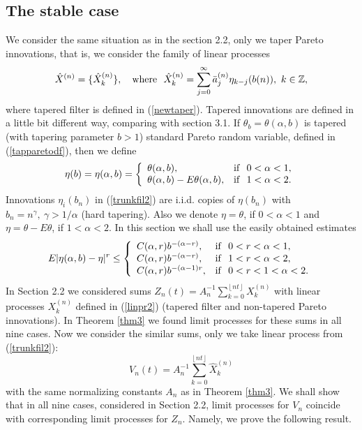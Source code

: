 \documentclass[12pt]{article}
\def\bz{{\bf Z}}
\def\bz{{\mathbb Z}} %
\def\a{\alpha}
\def\g{\gamma}
\newcommand{\sv}[1]{\left\lfloor #1 \right\rfloor}
\theoremstyle{plain}
\theoremstyle{definition}
\begin{document}
\subsection{The stable case}

We consider the same situation as in the section 2.2, only we taper Pareto innovations, that is, we consider the family of linear processes
\begin{equation}\label{trunkfil2}
{\hat X}^{(n)}=\{{\hat X}_k^{(n)} \}, \quad {\rm where} \ \  {\hat X}_k^{(n)}=\sum_{j=0}^\infty {\bar a}_j^{(n)}\eta_{k-j}(b(n)), \ k\in \bz,
\end{equation}
where tapered filter is defined in (\ref{newtaper}). Tapered innovations are defined in a little bit different way, comparing with  section 3.1.
If  $\theta_b= \theta (\a, b)$ is tapered (with tapering parameter $b>1$) standard Pareto random variable,  defined in (\ref{tapparetodf}), then we define
\begin{equation*}\label{tappar}
{\eta}(b)= {\eta}(\a, b)=\left \{\begin{array}{ll}
              \theta (\a, b), &  {\rm if} \ \ 0<\a<1, \\
              \theta (\a, b)-E\theta (\a, b), & {\rm if}\ \ 1< \a< 2.
               \end{array} \right.
\end{equation*}
Innovations $\eta_i(b_n)$ in (\ref{trunkfil2}) are i.i.d. copies of $\eta(b_n)$ with $b_n=n^\g, \ \g>1/\a$ (hard tapering).
Also we denote $\eta=\theta$, if $0<\a<1$ and $\eta=\theta -E\theta$, if $1<\a<2$. In this section we shall use the easily obtained estimates
\begin{equation}\label{estimate}
E|{\eta}(\a,b)- {\eta}|^r\le\left \{\begin{array}{ll}
             C(\a, r)b^{-(\a-r)}, &  {\rm if} \ \ 0<r<\a<1, \\
              C(\a, r) b^{-(\a-r)},  & {\rm if}\ \ 1<r< \a< 2, \\
              C(\a, r) b^{-(\a-1)r}, & {\rm if}\ \ 0<r<1< \a< 2. \\
               \end{array} \right.
\end{equation}
In Section 2.2 we considered sums $Z_n(t)=A_n^{-1}\sum_{k=0}^{\sv{nt}}X_k^{(n)}$ with linear processes $X_k^{(n)}$ defined in (\ref{linpr2}) (tapered filter and non-tapered Pareto innovations). In Theorem \ref{thm3} we found limit processes for these sums in all nine cases. Now we consider the similar sums, only we take linear process from (\ref{trunkfil2}):
$$
V_n(t)=A_n^{-1}\sum_{k=0}^{\sv{nt}}{\hat X}_k^{(n)}
$$
with the same  normalizing constants $A_n$ as in Theorem \ref{thm3}. We shall show that in all nine cases, considered in Section 2.2, limit processes for $V_n$ coincide with corresponding limit processes for $Z_n$. Namely, we prove the following result.
\end{document}
